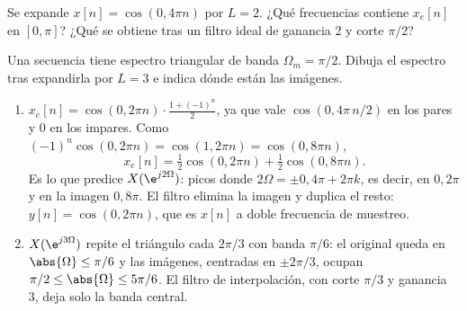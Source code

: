 \documentclass[11pt,a4paper]{scrartcl}
\begin{document}
\begin{ejercicio}
  \begin{incisos}[1]
    \item Se expande $x[n]=\cos(0{,}4\pi n)$ por $L=2$. ¿Qué frecuencias contiene $x_e[n]$ en $[0,\pi]$? ¿Qué se obtiene tras un filtro ideal de ganancia 2 y corte $\pi/2$?
    \item Una secuencia tiene espectro triangular de banda $\Omega_m=\pi/2$. Dibuja el espectro tras expandirla por $L=3$ e indica dónde están las imágenes.
  \end{incisos}
\end{ejercicio}
\begin{solucion}
  \begin{enumerate}[label=\alph*)]
    \item $x_e[n]=\cos(0{,}2\pi n)\cdot\frac{1+(-1)^n}{2}$, ya que vale $\cos(0{,}4\pi\,n/2)$ en los pares y 0 en los impares. Como $(-1)^n\cos(0{,}2\pi n)=\cos(1{,}2\pi n)=\cos(0{,}8\pi n)$,
    \[
      x_e[n]=\tfrac12\cos(0{,}2\pi n)+\tfrac12\cos(0{,}8\pi n).
    \]
    Es lo que predice $X(\e^{j2\Omega})$: picos donde $2\Omega=\pm0{,}4\pi+2\pi k$, es decir, en $0{,}2\pi$ y en la imagen $0{,}8\pi$. El filtro elimina la imagen y duplica el resto: $y[n]=\cos(0{,}2\pi n)$, que es $x[n]$ a doble frecuencia de muestreo.
    \item $X(\e^{j3\Omega})$ repite el triángulo cada $2\pi/3$ con banda $\pi/6$: el original queda en $\abs{\Omega}\le\pi/6$ y las imágenes, centradas en $\pm2\pi/3$, ocupan $\pi/2\le\abs{\Omega}\le5\pi/6$. El filtro de interpolación, con corte $\pi/3$ y ganancia 3, deja solo la banda central.
  \end{enumerate}
\end{solucion}
\end{document}
